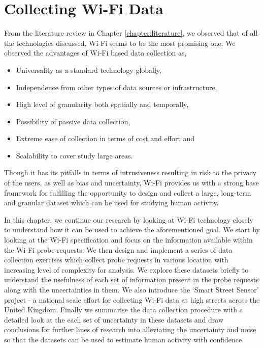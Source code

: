 \chapter{Collecting Wi-Fi Data}\label{chapter:collection}

From the literature review in Chapter \ref{chapter:literature}, we observed that  of all the technologies discussed, Wi-Fi seems to be the most promising one.
We observed the advantages of Wi-Fi based data collection as,

\begin{itemize}[rightmargin=2em, leftmargin=2em]
  \itemsep-0.25em
  \item Universality as a standard technology globally,
  \item Independence from other types of data sources or infrastructure,
  \item High level of granularity both spatially and temporally,
  \item Possibility of passive data collection,
  \item Extreme ease of collection in terms of cost and effort and
  \item Scalability to cover study large areas.
\end{itemize}

Though it has its pitfalls in terms of intrusiveness resulting in risk to the privacy of the users, as well as bias and uncertainty, Wi-Fi provides us with a strong base framework for fulfilling the opportunity to design and collect a large, long-term and granular dataset which can be used for studying human activity.

In this chapter, we continue our research by looking at Wi-Fi technology closely to understand how it can be used to achieve the aforementioned goal.
We start by looking at the Wi-Fi specification \cite{ieee2016} and focus on the information available within the Wi-Fi probe requests.
We then design and implement a series of data collection exercises which collect probe requests in various location with increasing level of complexity for analysis.
We explore these datasets briefly to understand the usefulness of each set of information present in the probe requests along with the uncertainties in them.
We also introduce the `Smart Street Sensor' project - a national scale effort for collecting Wi-Fi data at high streets across the United Kingdom.
Finally we summarise the data collection procedure with a detailed look at the each set of uncertainty in these datasets and draw conclusions for further lines of research into alleviating the uncertainty and noise so that the datasets can be used to estimate human activity with confidence.

